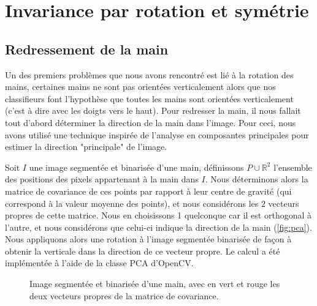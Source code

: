 \section{Invariance par rotation et symétrie}
\subsection{Redressement de la main}
Un des premiers problèmes que nous avons rencontré est lié à la rotation des mains, certaines mains ne sont pas orientées verticalement alors que nos classifieurs font l'hypothèse que toutes les mains sont orientées verticalement (c'est à dire avec les doigts vers le haut). Pour redresser la main, il nous fallait tout d'abord déterminer la direction de la main dans l'image. Pour ceci, nous avons utilisé une technique inspirée de l'analyse en composantes principales pour estimer la direction "principale" de l'image.

Soit $I$ une image segmentée et binarisée d'une main, définissons $P \cup \mathbb{R}^2$ l'ensemble des positions des pixels appartenant à la main dans $I$. Nous déterminons alors la matrice de covariance de ces points par rapport à leur centre de gravité (qui correspond à la valeur moyenne des points), et nous considérons les $2$ vecteurs propres de cette matrice. Nous en choisissons 1 quelconque car il est orthogonal à l'autre, et nous considérons que celui-ci indique la direction de la main (\autoref{fig:pca}). Nous appliquons alors une rotation à l'image segmentée binarisée de façon à obtenir la verticale dans la direction de ce vecteur propre. Le calcul a été implémentée à l'aide de la classe PCA d'OpenCV.

\begin{figure}[htb!]

\caption{Image segmentée et binarisée d'une main, avec en vert et rouge les deux vecteurs propres de la matrice de covariance.}
\label{fig:pca}
\end{figure}